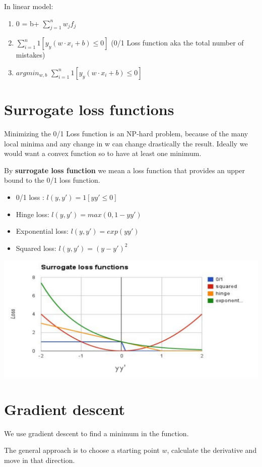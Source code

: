 \documentclass[oneside]{book}
\theoremstyle{definition}
\begin{document}
In linear model: 
\begin{enumerate}
	\item 0 = b+ $\sum_{j=1}^{n} w_jf_j$
	\item $\sum_{i=1}^{n}1[y_y(w\cdot x_i + b) \leq 0]$ (0/1 Loss function aka the total number of mistakes)
	\item $argmin_{w,b}$ $\sum_{i=1}^{n}1[y_y(w\cdot x_i + b) \leq 0]$
\end{enumerate}

\section{Surrogate loss functions}
Minimizing the 0/1 Loss function is an NP-hard problem, because of the many local minima and any change in w can change drastically the result. Ideally we would want a convex function so to have at least one minimum.

By \textbf{surrogate loss function} we mean a loss function that provides an upper bound to the 0/1 loss function. 

\begin{itemize}
	\item 0/1 loss : $l(y,y') = 1[yy'\leq 0]$
	\item Hinge loss: $l(y,y') = max(0,1-yy')$
	\item Exponential loss: $l(y,y') = exp(yy')$
	\item Squared loss: $l(y,y') = (y-y')^2$
\end{itemize}

\includegraphics[scale=0.2]{surrogate}

\section{Gradient descent}
We use gradient descent to find a minimum in the function. 

The general approach is to choose a starting point $w$, calculate the derivative and move in that direction.
\end{document}
